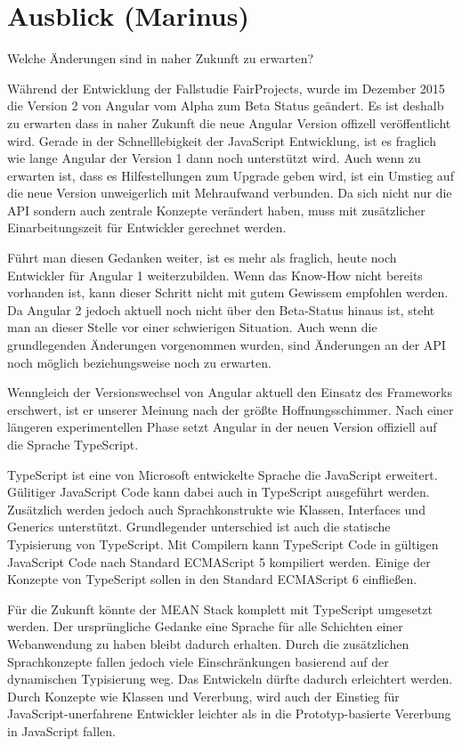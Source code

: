 \chapter{Ausblick (Marinus)}
\label{ausblick}

Welche Änderungen sind in naher Zukunft zu erwarten?

Während der Entwicklung der Fallstudie FairProjects, wurde im Dezember 2015 die Version 2 von Angular vom Alpha zum Beta Status geändert. Es ist deshalb zu erwarten dass in naher Zukunft die neue Angular Version offizell veröffentlicht wird. Gerade in der Schnelllebigkeit der JavaScript Entwicklung, ist es fraglich wie lange Angular der Version 1 dann noch unterstützt wird. Auch wenn zu erwarten ist, dass es Hilfestellungen zum Upgrade geben wird, ist ein Umstieg auf die neue Version unweigerlich mit Mehraufwand verbunden. Da sich nicht nur die API sondern auch zentrale Konzepte verändert haben, muss mit zusätzlicher Einarbeitungszeit für Entwickler gerechnet werden.

Führt man diesen Gedanken weiter, ist es mehr als fraglich, heute noch Entwickler für Angular 1 weiterzubilden. Wenn das Know-How nicht bereits vorhanden ist, kann dieser Schritt nicht mit gutem Gewissem empfohlen werden. Da Angular 2 jedoch aktuell noch nicht über den Beta-Status hinaus ist, steht man an dieser Stelle vor einer schwierigen Situation. Auch wenn die grundlegenden Änderungen vorgenommen wurden, sind Änderungen an der API noch möglich beziehungsweise noch zu erwarten.

Wenngleich der Versionswechsel von Angular aktuell den Einsatz des Frameworks erschwert, ist er unserer Meinung nach der größte Hoffnungsschimmer. Nach einer längeren experimentellen Phase setzt Angular in der neuen Version offiziell auf die Sprache TypeScript.

TypeScript ist eine von Microsoft entwickelte Sprache die JavaScript erweitert. Gülitiger JavaScript Code kann dabei auch in TypeScript ausgeführt werden. Zusätzlich werden jedoch auch Sprachkonstrukte wie Klassen, Interfaces und Generics unterstützt. Grundlegender unterschied ist auch die statische Typisierung von TypeScript. Mit Compilern kann TypeScript Code in gültigen JavaScript Code nach Standard ECMAScript 5 kompiliert werden. Einige der Konzepte von TypeScript sollen in den Standard ECMAScript 6 einfließen.

Für die Zukunft könnte der MEAN Stack komplett mit TypeScript umgesetzt werden. Der ursprüngliche Gedanke eine Sprache für alle Schichten einer Webanwendung zu haben bleibt dadurch erhalten. Durch die zusätzlichen Sprachkonzepte fallen jedoch viele Einschränkungen basierend auf der dynamischen Typisierung weg. Das Entwickeln dürfte dadurch erleichtert werden. Durch Konzepte wie Klassen und Vererbung, wird auch der Einstieg für JavaScript-unerfahrene Entwickler leichter als in die Prototyp-basierte Vererbung in JavaScript fallen.
